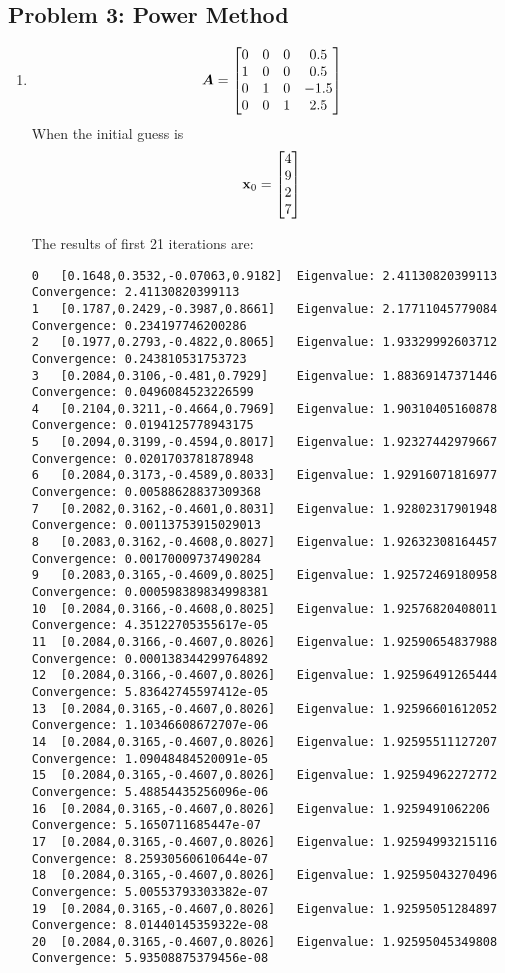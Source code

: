 \documentclass{article}
\begin{document}
\subsection*{{Problem 3: Power Method}}
\label{}
\begin{enumerate} 
\item 
\begin{align}
\boldsymbol{A}=\begin{bmatrix} 0 & 0 & 0 & 0.5   \\  
1 & 0 & 0 & 0.5   \\  
0 & 1 & 0 & -1.5   \\  
0 & 0 & 1 & 2.5  \end{bmatrix}
\end{align}
When the initial guess is 
\begin{align}
\boldsymbol{\mathrm{x}}_0=\begin{bmatrix} 4 \\ 9 \\ 2\\ 7 \end{bmatrix}
\end{align}

The results of first 21 iterations are: 
\begin{verbatim}
0	[0.1648,0.3532,-0.07063,0.9182]	 Eigenvalue: 2.41130820399113	 Convergence: 2.41130820399113
1	[0.1787,0.2429,-0.3987,0.8661]	 Eigenvalue: 2.17711045779084	 Convergence: 0.234197746200286
2	[0.1977,0.2793,-0.4822,0.8065]	 Eigenvalue: 1.93329992603712	 Convergence: 0.243810531753723
3	[0.2084,0.3106,-0.481,0.7929]	 Eigenvalue: 1.88369147371446	 Convergence: 0.0496084523226599
4	[0.2104,0.3211,-0.4664,0.7969]	 Eigenvalue: 1.90310405160878	 Convergence: 0.0194125778943175
5	[0.2094,0.3199,-0.4594,0.8017]	 Eigenvalue: 1.92327442979667	 Convergence: 0.0201703781878948
6	[0.2084,0.3173,-0.4589,0.8033]	 Eigenvalue: 1.92916071816977	 Convergence: 0.00588628837309368
7	[0.2082,0.3162,-0.4601,0.8031]	 Eigenvalue: 1.92802317901948	 Convergence: 0.00113753915029013
8	[0.2083,0.3162,-0.4608,0.8027]	 Eigenvalue: 1.92632308164457	 Convergence: 0.00170009737490284
9	[0.2083,0.3165,-0.4609,0.8025]	 Eigenvalue: 1.92572469180958	 Convergence: 0.000598389834998381
10	[0.2084,0.3166,-0.4608,0.8025]	 Eigenvalue: 1.92576820408011	 Convergence: 4.35122705355617e-05
11	[0.2084,0.3166,-0.4607,0.8026]	 Eigenvalue: 1.92590654837988	 Convergence: 0.000138344299764892
12	[0.2084,0.3166,-0.4607,0.8026]	 Eigenvalue: 1.92596491265444	 Convergence: 5.83642745597412e-05
13	[0.2084,0.3165,-0.4607,0.8026]	 Eigenvalue: 1.92596601612052	 Convergence: 1.10346608672707e-06
14	[0.2084,0.3165,-0.4607,0.8026]	 Eigenvalue: 1.92595511127207	 Convergence: 1.09048484520091e-05
15	[0.2084,0.3165,-0.4607,0.8026]	 Eigenvalue: 1.92594962272772	 Convergence: 5.48854435256096e-06
16	[0.2084,0.3165,-0.4607,0.8026]	 Eigenvalue: 1.9259491062206	 Convergence: 5.1650711685447e-07
17	[0.2084,0.3165,-0.4607,0.8026]	 Eigenvalue: 1.92594993215116	 Convergence: 8.25930560610644e-07
18	[0.2084,0.3165,-0.4607,0.8026]	 Eigenvalue: 1.92595043270496	 Convergence: 5.00553793303382e-07
19	[0.2084,0.3165,-0.4607,0.8026]	 Eigenvalue: 1.92595051284897	 Convergence: 8.01440145359322e-08
20	[0.2084,0.3165,-0.4607,0.8026]	 Eigenvalue: 1.92595045349808	 Convergence: 5.93508875379456e-08
\end{verbatim}


\end{enumerate}
\end{document}
